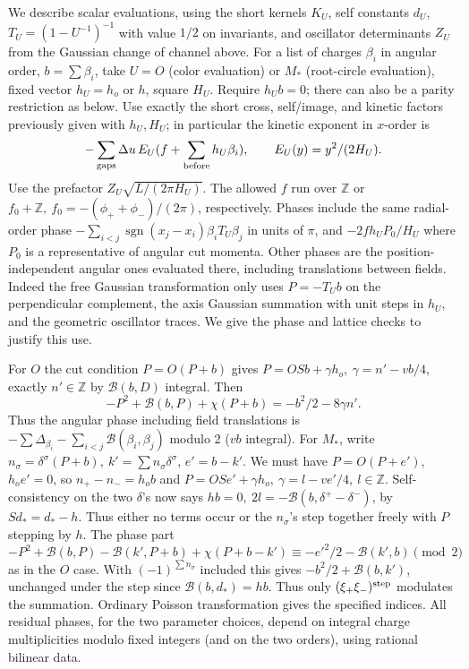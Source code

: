 We describe scalar evaluations, using the short kernels \(K_U\), self constants \(d_U\), \(T_U=(1-U^{-1})^{-1}\) with value \(1/2\) on invariants, and oscillator determinants \(Z_U\) from the Gaussian change of channel above. For a list of charges \(\beta_i\) in angular order, \(b=\sum\beta_i\), take \(U=O\) (color evaluation) or \(M_*\) (root-circle evaluation), fixed vector \(h_U=h_o\) or \(h\), square \(H_U\). Require \(h_U b=0\); there can also be a parity restriction as below. Use exactly the short cross, self/image, and kinetic factors previously given with \(h_U,H_U\); in particular the kinetic exponent in \(x\)-order is
\[
 -\sum_{\rm gaps}\Delta u\, E_U(f+\sum_{\rm before} h_U\beta_i),\qquad
 E_U(y)=y^2/(2H_U).
\]
Use the prefactor \(Z_U\sqrt{L/(2\pi H_U)}\). The allowed \(f\) run over \(\mathbb Z\) or \(f_0+\mathbb Z,\ f_0=-(\phi_++\phi_-)/(2\pi)\), respectively. Phases include the same radial-order phase \(-\sum_{i<j}\operatorname{sgn}(x_j-x_i)\beta_i T_U\beta_j\) in units of \(\pi\), and \(-2 f h_U P_0/H_U\) where \(P_0\) is a representative of angular cut momenta. Other phases are the position-independent angular ones evaluated there, including translations between fields. Indeed the free Gaussian transformation only uses \(P=-T_U b\) on the perpendicular complement, the axis Gaussian summation with unit steps in \(h_U\), and the geometric oscillator traces. We give the phase and lattice checks to justify this use.

For \(O\) the cut condition \(P=O(P+b)\) gives \(P=OS b+\gamma h_o,\ \gamma=n'-vb/4\), exactly \(n'\in\mathbb Z\) by \(\mathcal B(b,D)\) integral. Then
\[
 -P^2+\mathcal B(b,P)+\chi(P+b)=-b^2/2-8\gamma n' .
\]
Thus the angular phase including field translations is \(-\sum\Delta_{\beta_i}-\sum_{i<j}\mathcal B(\beta_i,\beta_j)\) modulo 2 (\(vb\) integral). For \(M_*\), write \(n_\sigma=\delta^\sigma(P+b),\ k'=\sum n_\sigma\delta^\sigma\), \(e'=b-k'\). We must have \(P=O(P+e')\), \(h_o e'=0\), so \(n_+-n_-=h_o b\) and \(P=OS e'+\gamma h_o,\ \gamma=l-v e'/4,\ l\in\mathbb Z\). Self-consistency on the two \(\delta\)'s now says \(h b=0,\ 2l=-\mathcal B(b,\delta^+-\delta^-)\), by \(S d_*=d_*-h\). Thus either no terms occur or the \(n_\sigma\)'s step together freely with \(P\) stepping by \(h\). The phase part
\[
 -P^2+\mathcal B(b,P)-\mathcal B(k',P+b)+\chi(P+b-k')
    \equiv -{e'}^2/2-\mathcal B(k',b)\pmod 2
\]
as in the \(O\) case. With \((-1)^{\sum n_\sigma}\) included this gives \(-b^2/2+\mathcal B(b,k')\), unchanged under the step since \(\mathcal B(b,d_*)=hb\). Thus only \((\xi_+\xi_-)^{\rm step}\) modulates the summation. Ordinary Poisson transformation gives the specified indices. All residual phases, for the two parameter choices, depend on integral charge multiplicities modulo fixed integers (and on the two orders), using rational bilinear data.

